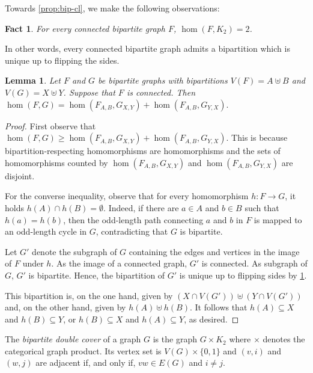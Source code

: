 \documentclass[10pt,a4paper]{article}
\theoremstyle{definition}
\theoremstyle{plain}
\newtheorem{lemma}[definition]{Lemma}
\newtheorem{fact}[definition]{Fact}
\theoremstyle{remark}
\begin{document}
	
	Towards \cref{prop:bip-cl}, we make the following observations:
	\begin{fact}\label{lem:bipartite3}
		For every connected bipartite graph $F$,
		$\hom(F, K_2) = 2$.
	\end{fact}
	In other words, every connected bipartite graph admits a bipartition which is unique up to flipping the sides. 
	
	\begin{lemma}\label{lem:bipartite1}
		Let $F$ and $G$ be bipartite graphs
		with bipartitions $V(F) = A \uplus B$ and $V(G) = X \uplus Y$. Suppose that $F$ is connected.
		Then
		$
		\hom(F, G) = \hom(F_{A, B}, G_{X, Y}) + \hom(F_{A, B}, G_{Y, X}).
		$ 
	\end{lemma}
	\begin{proof}
		First observe that $
		\hom(F, G) \geq \hom(F_{A, B}, G_{X, Y}) + \hom(F_{A, B}, G_{Y, X}).
		$ 
		This is because bipartition-respecting homomorphisms are homomorphisms and the sets of homomorphisms counted by $\hom(F_{A, B}, G_{X, Y}) $ and $\hom(F_{A, B}, G_{Y, X})$ are disjoint.
		
		For the converse inequality, observe that for every homomorphism $h \colon F \to G$, it holds $h(A) \cap h(B) = \emptyset$.
		Indeed, if there are $a \in A$ and $b \in B$ such that $h(a) = h(b)$, then the odd-length path connecting $a$ and $b$ in $F$ is mapped to an odd-length cycle in $G$,
		contradicting that $G$ is bipartite.
		
		Let $G'$ denote the subgraph of $G$ containing the edges and vertices in the image of $F$ under $h$.
		As the image of a connected graph,  $G'$ is connected.
		As subgraph of $G$, $G'$ is bipartite.
		Hence, the bipartition of $G'$ is unique up to flipping sides by \cref{lem:bipartite3}.
		
		This bipartition is, on the one hand, given by $(X \cap V(G')) \uplus (Y \cap V(G'))$ and, on the other hand, 
		given by $h(A) \uplus h(B)$.
		It follows that $h(A) \subseteq X$ and $h(B) \subseteq Y$, or $h(B) \subseteq X$ and $h(A) \subseteq Y$, as desired.
	\end{proof}
	
	
	
	The \emph{bipartite double cover} of a graph $G$ is the graph $G \times K_2$ where  $\times$ denotes the categorical graph product.
	Its vertex set is $V(G) \times \{0,1\}$ and $(v, i)$ and $(w,j)$ are adjacent if, and only if, $vw \in E(G)$ and $i \neq j$.
	
\end{document}
